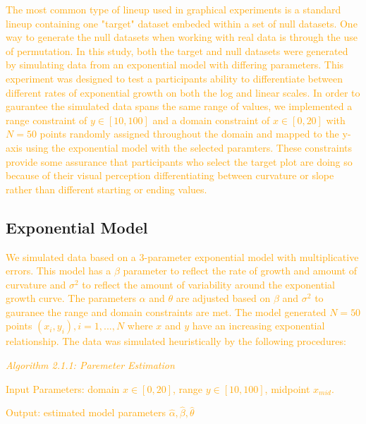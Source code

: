 \documentclass[]{interact}
\theoremstyle{plain}%
\theoremstyle{definition}
\theoremstyle{remark}
\begin{document}
\textcolor{Orange}{
The most common type of lineup used in graphical experiments is a standard lineup containing one "target" dataset embeded within a set of null datasets. 
One way to generate the null datasets when working with real data is through the use of permutation. 
In this study, both the target and null datasets were generated by simulating data from an exponential model with differing parameters. 
This experiment was designed to test a participants ability to differentiate between different rates of exponential growth on both the log and linear scales. 
In order to gaurantee the simulated data spans the same range of values, we implemented a range constraint of $y\in [10,100]$ and a domain constraint of $x\in [0,20]$ with $N = 50$ points randomly assigned throughout the domain and mapped to the y-axis using the exponential model with the selected paramters. 
These constraints provide some assurance that participants who select the target plot are doing so because of their visual perception differentiating between curvature or slope rather than different starting or ending values. 
}

\hypertarget{exponential-model}{%
\subsection{Exponential Model}\label{exponential-model}}

\textcolor{Orange}{
We simulated data based on a 3-parameter exponential model with multiplicative errors. 
This model has a $\beta$ parameter to reflect the rate of growth and amount of curvature and $\sigma^2$ to reflect the amount of variability around the exponential growth curve. 
The parameters $\alpha$ and $\theta$ are adjusted based on $\beta$ and $\sigma^2$ to gauranee the range and domain constraints are met. 
The model generated $N = 50$ points $(x_i, y_i), i = 1,...,N$ where $x$ and $y$ have an increasing exponential relationship. 
The data was simulated heuristically by the following procedures:
}
\vspace{3 mm}

\textcolor{Orange}{\textit{Algorithm 2.1.1: Paremeter Estimation}}

\textcolor{Orange}{Input Parameters: domain $x\in[0,20]$, range $y\in[10,100]$, midpoint $x_{mid}$.}

\textcolor{Orange}{Output: estimated model parameters $\hat\alpha, \hat\beta, \hat\theta$}
\end{document}
